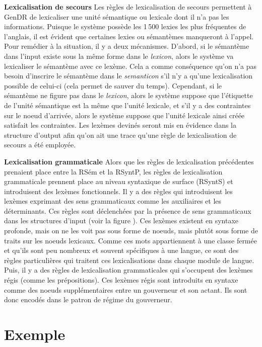 \textbf{Lexicalisation de secours}
Les règles de lexicalisation de secours permettent à GenDR de lexicaliser une unité sémantique ou lexicale dont il n'a pas les informations. Puisque le système possède les 1\,500 lexies les plus fréquentes de l'anglais, il est évident que certaines lexies ou sémantèmes manqueront à l'appel. Pour remédier à la situation, il y a deux mécanismes. D'abord, si le sémantème dans l'input existe sous la même forme dans le \emph{lexicon}, alors le système va lexicaliser le sémantème avec ce lexème. Cela a comme conséquence qu'on n'a pas besoin d'inscrire le sémantème dans le \emph{semanticon} s'il n'y a qu'une lexicalisation possible de celui-ci (cela permet de sauver du temps). Cependant, si le sémantème ne figure pas dans le \emph{lexicon}, alors le système suppose que l'étiquette de l'unité sémantique est la même que l'unité lexicale, et s'il y a des contraintes sur le noeud d'arrivée, alors le système suppose que l'unité lexicale ainsi créée satisfait les contraintes. Les lexèmes devinés seront mis en évidence dans la structure d'output afin qu'on ait une trace qu'une règle de lexicalisation de secours a été employée.
	
\textbf{Lexicalisation grammaticale}
Alors que les règles de lexicalisation précédentes prenaient place entre la RSém et la RSyntP, les règles de lexicalisation grammaticale prennent place au niveau syntaxique de surface (RSyntS) et introduisent des lexèmes fonctionnels. Il y a des règles qui introduisent les lexèmes exprimant des sens grammaticaux comme les auxiliaires et les déterminants. Ces règles sont déclenchées par la présence de sens grammaticaux dans les structures d'input (voir la figure ). Ces lexèmes existent en syntaxe profonde, mais on ne les voit pas sous forme de noeuds, mais plutôt sous forme de traits sur les noeuds lexicaux. Comme ces mots appartiennent à une classe fermée et qu'ils sont peu nombreux et souvent spécifiques à une langue, ce sont des règles particulières qui traitent ces lexicalisations dans chaque module de langue. Puis, il y a des règles de lexicalisation grammaticales qui s'occupent des lexèmes régis (comme les prépositions). Ces lexèmes régis sont introduits en syntaxe comme des noeuds supplémentaires entre un gouverneur et son actant. Ils sont donc encodés dans le patron de régime du gouverneur.


\section{Exemple}\label{secexemple}

